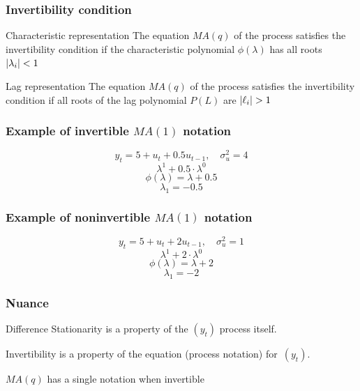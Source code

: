 %	







\begin{frame}
	\frametitle{Invertibility condition}
	
	\begin{block}{Characteristic representation}
		The equation $MA(q)$ of the process satisfies the invertibility  condition if
		the characteristic polynomial $\phi(\lambda)$ has all roots $\abs{\lambda_i} <1$
	\end{block}
	
	\pause
	
	\begin{block}{Lag representation}
		The equation $MA(q)$ of the process satisfies the invertibility condition if all roots  of 
		the lag polynomial $P(L)$ are  $\abs{\ell_i} >1$
	\end{block}
	
	
\end{frame}

\begin{frame}
	\frametitle{Example of invertible $MA(1)$ notation }
	
	\[
	y_t = 5 + u_t + 0.5 u_{t-1}, \quad \sigma^2_u = 4
	\]
	\pause
	\[
	\lambda^1 + 0.5 \cdot \lambda^0
	\]
	\[
	\phi(\lambda) = \lambda + 0.5
	\]
	\pause
	\[
	\lambda_1 = -0.5
	\]
	
\end{frame}


\begin{frame}
	\frametitle{Example of noninvertible  $MA(1)$  notation}
	
	\[
	y_t = 5 + u_t + 2 u_{t-1}, \quad \sigma^2_u = 1
	\]
	\pause
	\[
	\lambda^1 + 2 \cdot \lambda^0
	\]
	\[
	\phi(\lambda) = \lambda + 2
	\]
	\pause
	\[
	\lambda_1 = -2
	\]
\end{frame}


\begin{frame}
	\frametitle{Nuance}
	
	\begin{block}{Difference}
		Stationarity is a property of the $(y_t)$ process itself.
		
		Invertibility is a property of the equation (process  notation) for~$(y_t)$.
	\end{block}
	
	\pause
    $MA(q)$ has a single notation when invertible
	
\end{frame}




